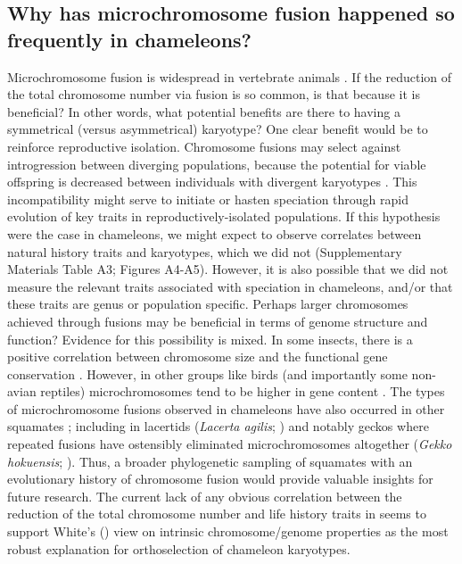 \documentclass[a4paper, 12pt]{article}
\begin{document}
\subsection{Why has microchromosome fusion happened so frequently in chameleons?}
Microchromosome fusion is widespread in vertebrate animals \citep{waters2021microchromosomes}. 
If the reduction of the total chromosome number via fusion is so common, is that because it is beneficial? In other words, what potential benefits are there to having a symmetrical (versus asymmetrical) karyotype? 
One clear benefit would be to reinforce reproductive isolation. 
Chromosome fusions may select against introgression between diverging populations, because the potential for viable offspring is decreased between individuals with divergent karyotypes \citep{cicconardi2021chromosome}.
This incompatibility might serve to initiate or hasten speciation through rapid evolution of key traits in reproductively-isolated populations. If this hypothesis were the case in chameleons, we might expect to observe correlates between natural history traits and karyotypes, which we did not (Supplementary Materials Table A3; Figures A4-A5). 
However, it is also possible that we did not measure the relevant traits associated with speciation in chameleons, and/or that these traits are genus or population specific.
Perhaps larger chromosomes achieved through fusions may be beneficial in terms of genome structure and function? Evidence for this possibility is mixed. In some insects, there is a positive correlation between chromosome size and the functional gene conservation \citep{cicconardi2021chromosome}. 
However, in other groups like birds (and importantly some non-avian reptiles) microchromosomes tend to be higher in gene content \citep{waters2021microchromosomes}.
The types of microchromosome fusions observed in chameleons have also occurred in other squamates \citep{deakin2016anchoring}; including in lacertids (\textit{Lacerta agilis}; \citealt{srikulnath2014identification}) and notably geckos where repeated fusions have ostensibly eliminated microchromosomes altogether (\textit{Gekko hokuensis}; \citealt{srikulnath2015karyotype}). 
Thus, a broader phylogenetic sampling of squamates with an evolutionary history of chromosome fusion would provide valuable insights for future research. 
The current lack of any obvious correlation between the reduction of the total chromosome number and life history traits in seems to support White's (\citeyear{white1973,white1975chromosome}) view on intrinsic chromosome/genome properties as the most robust explanation for orthoselection of chameleon karyotypes.
\end{document}
